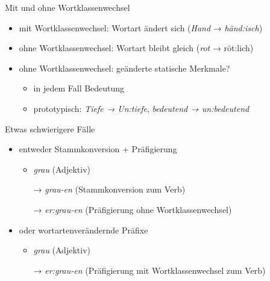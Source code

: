 \begin{frame}
  {Mit und ohne Wortklassenwechsel}
  \pause
  \begin{itemize}[<+->]
    \item \alert{mit} Wortklassenwechsel: Wortart ändert sich (\textit{Hand} → \textit{händ:isch})
    \item \alert{ohne} Wortklassenwechsel: Wortart bleibt gleich (\textit{rot} → röt:lich)
      \Zeile
    \item ohne Wortklassenwechsel: geänderte statische Merkmale?
      \begin{itemize}[<+->]
        \item in jedem Fall \alert{Bedeutung}
        \item prototypisch: \textit{Tiefe → Un:tiefe}, \textit{bedeutend → un:bedeutend}
      \end{itemize}
  \end{itemize}
\end{frame}

\begin{frame}
  {Etwas schwierigere Fälle}
  \pause
  \begin{exe}
    \ex
    \begin{xlist}
    \end{xlist}
    \pause
    \ex
    \begin{xlist}
    \end{xlist}
  \end{exe}
  \pause
  \Halbzeile
  \begin{itemize}[<+->]
    \item entweder \alert{Stammkonversion + Präfigierung}
      \begin{itemize}[<+->]
        \item \textit{grau} (Adjektiv)
        \item[→] \textit{grau-en} (Stammkonversion zum Verb)
        \item[→] \textit{er:grau-en} (Präfigierung ohne Wortklassenwechsel)
      \end{itemize}
    \item oder \alert{wortartenverändernde Präfixe}
      \begin{itemize}[<+->]
        \item \textit{grau} (Adjektiv)
        \item[→] \textit{er:grau-en} (Präfigierung mit Wortklassenwechsel zum Verb)
      \end{itemize}
  \end{itemize}
\end{frame}

